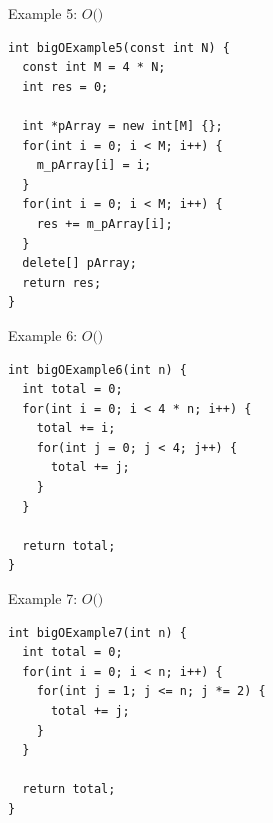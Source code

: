 \documentclass[14pt,aspectratio=1610, hyperref={pdfpagelayout=SinglePage}]{beamer}
\begin{document}
\begin{frame}[fragile]{Example 5: \(O(\)\()\)}
\begin{lstlisting}[]
int bigOExample5(const int N) {
  const int M = 4 * N;
  int res = 0;
  
  int *pArray = new int[M] {};
  for(int i = 0; i < M; i++) {
    m_pArray[i] = i;
  }
  for(int i = 0; i < M; i++) {
    res += m_pArray[i];
  }
  delete[] pArray;
  return res;
}
\end{lstlisting}
\end{frame}

\begin{frame}[fragile]{Example 6: \(O(\)\()\)}
\begin{lstlisting}[]
int bigOExample6(int n) {
  int total = 0;
  for(int i = 0; i < 4 * n; i++) {
    total += i;
    for(int j = 0; j < 4; j++) {
      total += j;
    }
  }

  return total;
}
\end{lstlisting}
\end{frame}

\begin{frame}[fragile]{Example 7: \(O(\)\()\)}
\begin{lstlisting}[]
int bigOExample7(int n) {
  int total = 0;
  for(int i = 0; i < n; i++) {
    for(int j = 1; j <= n; j *= 2) {
      total += j;
    }
  }

  return total;
}
\end{lstlisting}
\end{frame}

\end{document}
